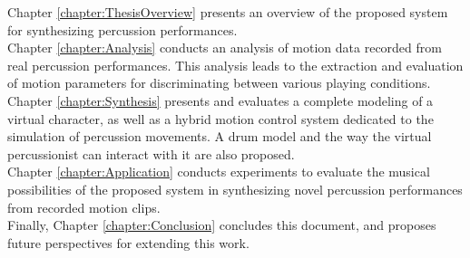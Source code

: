 Chapter \ref{chapter:ThesisOverview} presents an overview of the proposed system for synthesizing percussion performances.\\

Chapter \ref{chapter:Analysis} conducts an analysis of motion data recorded from real percussion performances. This analysis leads to the extraction and evaluation of motion parameters for discriminating between various playing conditions.\\

Chapter \ref{chapter:Synthesis} presents and evaluates a complete modeling of a virtual character, as well as a hybrid motion control system dedicated to the simulation of percussion movements. A drum model and the way the virtual percussionist can interact with it are also proposed.\\

Chapter \ref{chapter:Application} conducts experiments to evaluate the musical possibilities of the proposed system in synthesizing novel percussion performances from recorded motion clips.\\

Finally, Chapter \ref{chapter:Conclusion} concludes this document, and proposes future perspectives for extending this work.










